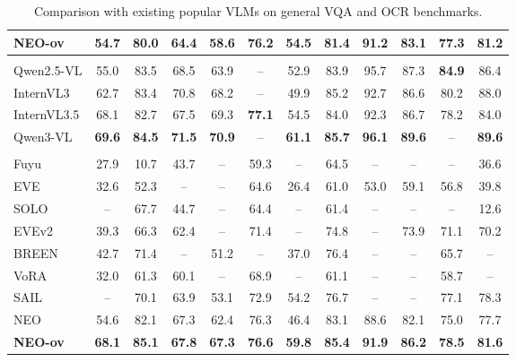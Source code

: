 \documentclass[11pt]{article}
\begin{document}
\begin{table}[t!]
{\begin{tabular}{lccccccccccc}
\rowcolor{gray!18} \textbf{NEO-ov} &\textbf{54.7} &\textbf{80.0} &\textbf{64.4} &\textbf{58.6} &\textbf{76.2} &\textbf{54.5} &\textbf{81.4} &\textbf{91.2} &\textbf{83.1}  &\textbf{77.3} &\textbf{81.2} \\

\midrule
\rowcolor{tablerowcolor1} \multicolumn{12}{l}{$\blacktriangledown$ \emph{Modular Vision-Language Models (Instruct-8B)}} \\

Qwen2.5-VL &55.0 &83.5 &68.5 &63.9 &-- &52.9 &83.9 &95.7 &87.3 &\textbf{84.9} &86.4 \\

InternVL3 &62.7 &83.4 &70.8 &68.2 &-- &49.9
&85.2 &92.7 &86.6 &80.2 &88.0 \\

InternVL3.5 &68.1 &82.7 &67.5 &69.3 &\textbf{77.1} &54.5 &84.0 &92.3 &86.7 &78.2 &84.0 \\

Qwen3-VL &\textbf{69.6} &\textbf{84.5} &\textbf{71.5} &\textbf{70.9} &-- &\textbf{61.1} &\textbf{85.7} &\textbf{96.1} &\textbf{89.6} &-- &\textbf{89.6} \\

\midrule

\rowcolor{tablerowcolor} \multicolumn{12}{l}{$\blacktriangledown$ \emph{Native Vision-Language Models (Instruct-8B)}} \\

Fuyu &27.9 & 10.7 & 43.7 & -- & 59.3 & --  & 64.5 & -- & -- & -- & 36.6 \\

EVE &32.6& 52.3 & -- & -- & 64.6 & 26.4 & 61.0 & 53.0 & 59.1 & 56.8 & 39.8 \\

SOLO &-- & 67.7 & 44.7 & -- & 64.4 & -- & 61.4 & -- & -- & -- & 12.6 \\

EVEv2 &39.3 & 66.3 &62.4 & -- & 71.4  & -- & 74.8 & -- & 73.9 & 71.1 & 70.2 \\

BREEN &42.7 & 71.4 & -- & 51.2 & -- & 37.0 & 76.4 & -- & -- & 65.7 & -- \\

VoRA &32.0 & 61.3 & 60.1 & -- & 68.9 & -- & 61.1 & -- & -- & 58.7 & -- \\

SAIL &-- & 70.1 & 63.9 & 53.1 & 72.9 & 54.2 & 76.7 & -- & --  & 77.1 & 78.3 \\

NEO &54.6 &82.1 &67.3 &62.4 &76.3 &46.4 &83.1 &88.6 &82.1 &75.0 &77.7 \\

\rowcolor{gray!18} 
\textbf{NEO-ov} &\textbf{68.1} &\textbf{85.1} &\textbf{67.8} &\textbf{67.3} &\textbf{76.6} &\textbf{59.8} &\textbf{85.4} &\textbf{91.9} &\textbf{86.2} &\textbf{78.5} &\textbf{81.6}\\
\bottomrule
\end{tabular}
}
\caption{Comparison with existing popular VLMs on general VQA and OCR benchmarks.}
\setlength\tabcolsep{2pt}
\label{tab:results_image}
\end{table}
\end{document}
